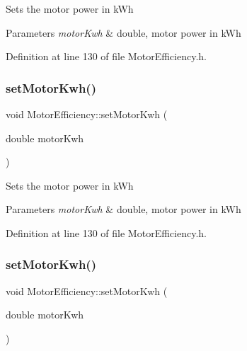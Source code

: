 Sets the motor power in k\+Wh 
\begin{DoxyParams}{Parameters}
{\em motor\+Kwh} & double, motor power in k\+Wh \\
\hline
\end{DoxyParams}


Definition at line 130 of file Motor\+Efficiency.\+h.

\mbox{\label{class_motor_efficiency_ab1c7507bac259565e43a6777d079148b}} 
\subsubsection{\texorpdfstring{set\+Motor\+Kwh()}{setMotorKwh()}\hspace{0.1cm}{\footnotesize\ttfamily [2/3]}}
{\footnotesize\ttfamily void Motor\+Efficiency\+::set\+Motor\+Kwh (\begin{DoxyParamCaption}\item[{double}]{motor\+Kwh }\end{DoxyParamCaption})\hspace{0.3cm}{\ttfamily [inline]}}

Sets the motor power in k\+Wh 
\begin{DoxyParams}{Parameters}
{\em motor\+Kwh} & double, motor power in k\+Wh \\
\hline
\end{DoxyParams}


Definition at line 130 of file Motor\+Efficiency.\+h.

\mbox{\label{class_motor_efficiency_ab1c7507bac259565e43a6777d079148b}} 
\subsubsection{\texorpdfstring{set\+Motor\+Kwh()}{setMotorKwh()}\hspace{0.1cm}{\footnotesize\ttfamily [3/3]}}
{\footnotesize\ttfamily void Motor\+Efficiency\+::set\+Motor\+Kwh (\begin{DoxyParamCaption}\item[{double}]{motor\+Kwh }\end{DoxyParamCaption})\hspace{0.3cm}{\ttfamily [inline]}}

